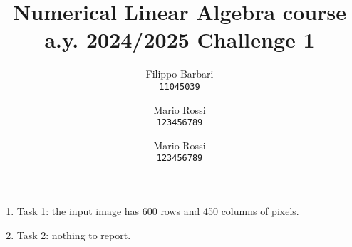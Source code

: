\documentclass{article}
\author{
	Filippo Barbari\\
	\texttt{11045039}
	\and
	Mario Rossi\\
	\texttt{123456789}
	\and
	Mario Rossi\\
	\texttt{123456789}
}
\title{Numerical Linear Algebra course a.y. 2024/2025 Challenge 1}
\begin{document}
	\maketitle

	\begin{enumerate}
		\item Task 1: the input image has 600 rows and 450 columns of pixels.
		\item Task 2: nothing to report.
	\end{enumerate}
\end{document}
